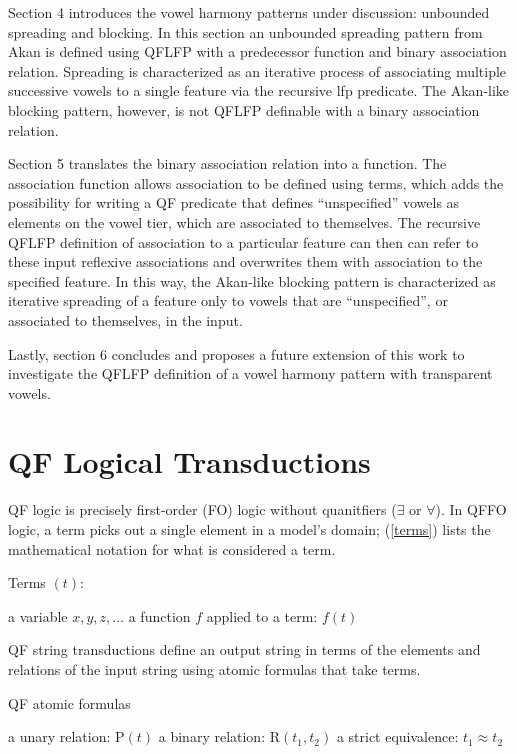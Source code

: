\documentclass[,doc,floatsintext]{apa6}
\theoremstyle{definition}
\theoremstyle{definition}
\theoremstyle{definition}
\theoremstyle{remark}
\begin{document}
Section 4 introduces the vowel harmony patterns under discussion:
unbounded spreading and blocking. In this section an unbounded spreading
pattern from Akan is defined using QFLFP with a predecessor function and
binary association relation. Spreading is characterized as an iterative
process of associating multiple successive vowels to a single feature
via the recursive lfp predicate. The Akan-like blocking pattern,
however, is not QFLFP definable with a binary association relation.

Section 5 translates the binary association relation into a function.
The association function allows association to be defined using terms,
which adds the possibility for writing a QF predicate that defines
\enquote{unspecified} vowels as elements on the vowel tier, which are
associated to themselves. The recursive QFLFP definition of association
to a particular feature can then can refer to these input reflexive
associations and overwrites them with association to the specified
feature. In this way, the Akan-like blocking pattern is characterized as
iterative spreading of a feature only to vowels that are
\enquote{unspecified}, or associated to themselves, in the input.

Lastly, section 6 concludes and proposes a future extension of this work
to investigate the QFLFP definition of a vowel harmony pattern with
transparent vowels.

\section{QF Logical Transductions}\label{qf-logical-transductions}

QF logic is precisely first-order (FO) logic without quanitfiers
(\(\exists\) or \(\forall\)). In QFFO logic, a term picks out a single
element in a model's domain; (\ref{terms}) lists the mathematical
notation for what is considered a term.

\begin{exe}
\ex Terms $(t)$: \label{terms}
  \begin{xlist}
  \ex a variable $x, y, z, ...$
  \ex a function $f$ applied to a term: $f(t)$
  \end{xlist}
\end{exe}

\noindent QF string transductions define an output string in terms of
the elements and relations of the input string using atomic formulas
that take terms.

\begin{exe}
\ex QF atomic formulas\label{atom}
  \begin{xlist}
  \ex a unary relation: P$(t)$
  \ex a binary relation: R$(t_1, t_2)$ 
  \ex a strict equivalence: $t_1 \approx t_2$
  \end{xlist}
\end{exe}
\end{document}
